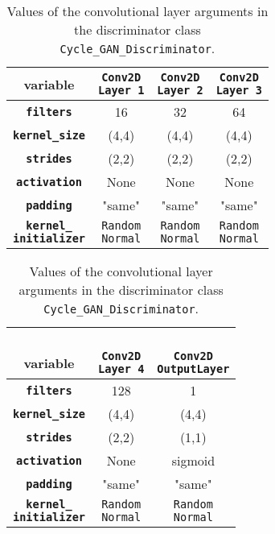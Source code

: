 \documentclass[fleqn,10pt]{SelfArx} %
\begin{document}
\begin{table}[htb]
\centering
\caption{Values of the convolutional layer arguments in the discriminator class \texttt{Cycle\_GAN\-\_Discriminator}\cite{image-to-image-ccan}.}
\label{tab:discriminatorValues}
\begin{tabular}{c c c c}
\textbf{variable} & \makecell[cc]{\textbf{\texttt{Conv2D}} \\ \textbf{\texttt{Layer 1}}} & \makecell[cc]{\textbf{\texttt{Conv2D}} \\ \textbf{\texttt{Layer 2}}} & \makecell[cc]{\textbf{\texttt{Conv2D}} \\ \textbf{\texttt{Layer 3}}} \\ \hline
\textbf{\texttt{filters}} & 16 & 32 & 64 \\ \hline
\textbf{\texttt{kernel\_size}} & (4,4) & (4,4) & (4,4) \\ \hline
\textbf{\texttt{strides}} & (2,2) & (2,2) & (2,2) \\ \hline
\textbf{\texttt{activation}} & None & None & None\\ \hline 
\textbf{\texttt{padding}} & "same" & "same" & "same" \\ \hline
\makecell[cc]{\textbf{\texttt{kernel\_}} \\ \textbf{\texttt{initializer}}} & \makecell[cc]{\texttt{Random} \\ \texttt{Normal}} & \makecell[cc]{\texttt{Random} \\ \texttt{Normal}} & \makecell[cc]{\texttt{Random} \\ \texttt{Normal}} \\ \hline
\end{tabular}

\begin{tabular}{c c c}
\makecell[cc]{\\ \textbf{variable}} & \makecell[cc]{\\ \textbf{\texttt{Conv2D}} \\ \textbf{\texttt{Layer 4}}} & \makecell[cc]{\\ \textbf{\texttt{Conv2D}} \\ \textbf{\texttt{OutputLayer}}} \\ \hline
\textbf{\texttt{filters}} & 128 & 1 \\ \hline
\textbf{\texttt{kernel\_size}} & (4,4) & (4,4) \\ \hline
\textbf{\texttt{strides}} & (2,2) & (1,1) \\ \hline
\textbf{\texttt{activation}} & None & sigmoid \\ \hline 
\textbf{\texttt{padding}} & "same" & "same" \\ \hline
\makecell[cc]{\textbf{\texttt{kernel\_}} \\ \textbf{\texttt{initializer}}} & \makecell[cc]{\texttt{Random} \\ \texttt{Normal}} & \makecell[cc]{\texttt{Random} \\ \texttt{Normal}} \\ \hline
\end{tabular}
\end{table}
\end{document}

